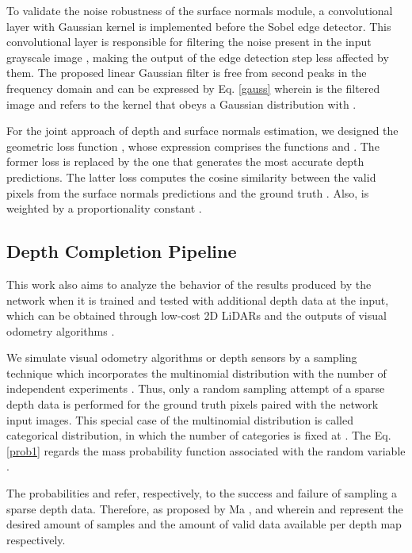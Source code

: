 \documentclass[5p]{elsarticle}
\begin{document}
To validate the noise robustness of the surface normals module, a convolutional layer with Gaussian kernel \cite{afshari2017gaussian} is implemented before the Sobel edge detector. This convolutional layer is responsible for filtering the noise present in the input grayscale image , making the output of the edge detection step less affected by them. The proposed linear Gaussian filter is free from second peaks in the frequency domain and can be expressed by Eq. \ref{gauss} wherein  is the filtered image and  refers to the  kernel that obeys a Gaussian distribution with .




For the joint approach of depth and surface normals estimation, we designed the geometric loss function , whose expression comprises the functions  and . The former loss is replaced by the one that generates the most accurate depth predictions. The latter loss computes the cosine similarity between the valid pixels from the surface normals predictions  and the ground truth . Also,  is weighted by a proportionality constant .




\subsection{Depth Completion Pipeline}

This work also aims to analyze the behavior of the results produced by the network when it is trained and tested with additional depth data at the input, which can be obtained through low-cost 2D LiDARs and the outputs of visual odometry algorithms \cite{ma2018sparse}. 

We simulate visual odometry algorithms or depth sensors by a sampling technique which incorporates the multinomial distribution with the number of independent experiments . Thus, only a random sampling attempt of a sparse depth data  is performed for the ground truth pixels paired with the network input images. This special case of the multinomial distribution is called categorical distribution, in which the number of categories is fixed at . The Eq. \ref{prob1} regards the mass probability function associated with the random variable .



The probabilities  and  refer, respectively, to the success and failure of sampling a sparse depth data. Therefore, as proposed by Ma \etal \cite{ma2018sparse},  and  wherein  and  represent the desired amount of samples and the amount of valid data available per depth map respectively. 
\end{document}
